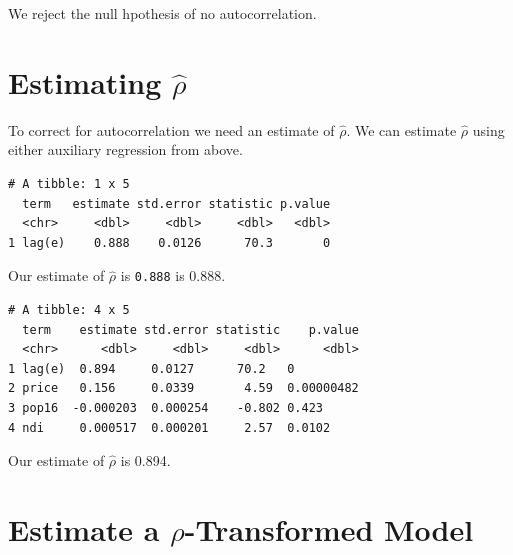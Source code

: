 \documentclass[]{book}
\newenvironment{Shaded}{\begin{snugshade}}{\end{snugshade}}
\newcommand{\DecValTok}[1]{\textcolor[rgb]{0.00,0.00,0.81}{#1}}
\newcommand{\KeywordTok}[1]{\textcolor[rgb]{0.13,0.29,0.53}{\textbf{#1}}}
\newcommand{\NormalTok}[1]{#1}
\newcommand{\OperatorTok}[1]{\textcolor[rgb]{0.81,0.36,0.00}{\textbf{#1}}}
\newcommand{\StringTok}[1]{\textcolor[rgb]{0.31,0.60,0.02}{#1}}
\begin{document}
We reject the null hpothesis of no autocorrelation.

\hypertarget{estimating-hatrho}{%
\section{\texorpdfstring{Estimating \(\hat\rho\)}{Estimating \textbackslash{}hat\textbackslash{}rho}}\label{estimating-hatrho}}

To correct for autocorrelation we need an estimate of \(\hat\rho\). We can estimate \(\hat\rho\) using either auxiliary regression from above.

\begin{Shaded}
\end{Shaded}

\begin{verbatim}
# A tibble: 1 x 5
  term   estimate std.error statistic p.value
  <chr>     <dbl>     <dbl>     <dbl>   <dbl>
1 lag(e)    0.888    0.0126      70.3       0
\end{verbatim}

Our estimate of \(\hat\rho\) is \texttt{0.888} is 0.888.

\begin{Shaded}
\end{Shaded}

\begin{verbatim}
# A tibble: 4 x 5
  term    estimate std.error statistic    p.value
  <chr>      <dbl>     <dbl>     <dbl>      <dbl>
1 lag(e)  0.894     0.0127      70.2   0         
2 price   0.156     0.0339       4.59  0.00000482
3 pop16  -0.000203  0.000254    -0.802 0.423     
4 ndi     0.000517  0.000201     2.57  0.0102    
\end{verbatim}

Our estimate of \(\hat\rho\) is 0.894.

\hypertarget{estimate-a-rho-transformed-model}{%
\section{\texorpdfstring{Estimate a \(\rho\)-Transformed Model}{Estimate a \textbackslash{}rho-Transformed Model}}\label{estimate-a-rho-transformed-model}}
\end{document}
